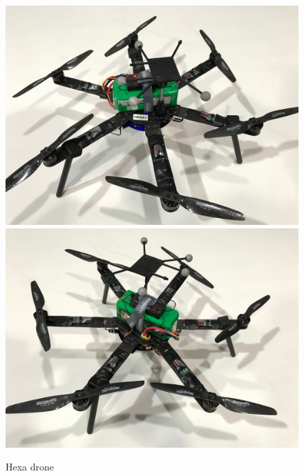 \begin{figure}[!htb]
  \includegraphics[width=\linewidth]{chapters/chapter-03/figures/hexa_1.jpg}
\endminipage\hfill
{}
  \includegraphics[width=\linewidth]{chapters/chapter-03/figures/hexa_2.jpg}
\endminipage
\caption{Hexa drone}
\label{fig:hexa}
\end{figure}
